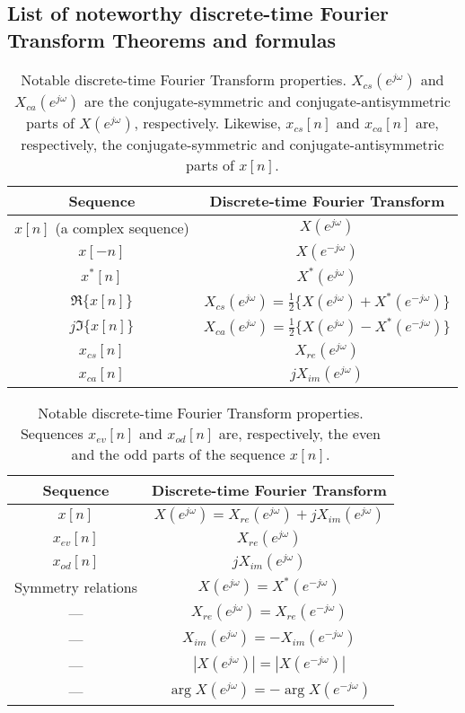 \documentclass[\documentfontsize, twocolumn]{\classname}
\begin{document}
\subsection{List of noteworthy discrete-time Fourier Transform Theorems and formulas}

\begin{table*}[ht]
\centering
\begin{tabular}{c c}
    \hline
    \textbf{Sequence} & \textbf{Discrete-time Fourier Transform} \\
    \hline
    $x[n]$ (a complex sequence) & $X(e^{j\omega})$ \\
    \hline
    $x[-n]$ & $X(e^{-j\omega})$ \\
    $x^*[n]$ & $X^*(e^{j\omega})$ \\
    $\Re{\{x[n]\}}$ & $X_{cs}(e^{j\omega}) = \frac 1 2 \{X(e^{j\omega}) + X^*(e^{-j\omega})\}$\\
    $j\Im{\{x[n]\}}$ & $X_{ca}(e^{j\omega}) = \frac 1 2 \{X(e^{j\omega}) - X^*(e^{-j\omega})\}$\\
    $x_{cs}[n]$ & $X_{re}(e^{j\omega})$ \\
    $x_{ca}[n]$ & $jX_{im}(e^{j\omega})$ \\
    \hline
\end{tabular}
\caption{Notable discrete-time Fourier Transform properties. $X_{cs}(e^{j\omega})$ and $X_{ca}(e^{j\omega})$ are the conjugate-symmetric and conjugate-antisymmetric parts of $X(e^{j\omega})$, respectively. Likewise, $x_{cs}[n]$ and $x_{ca}[n]$ are, respectively, the conjugate-symmetric and conjugate-antisymmetric parts of $x[n]$.}\label{tab:discreteTimeFourierTransformPropertiesAndTheorems}
\end{table*}

\begin{table*}[ht]
\centering
\begin{tabular}{c c}
    \hline
    \textbf{Sequence} & \textbf{Discrete-time Fourier Transform} \\
    \hline
    $x[n]$ & $X(e^{j\omega}) = X_{re}(e^{j\omega}) + jX_{im}(e^{j\omega})$ \\
    \hline
    $x_{ev}[n]$ & $X_{re}(e^{j\omega})$ \\
    $x_{od}[n]$ & $jX_{im}(e^{j\omega})$ \\
    \hline
    Symmetry relations & $X(e^{j\omega}) = X^*(e^{-j\omega})$ \\
    --- & $X_{re}(e^{j\omega}) = X_{re}(e^{-j\omega})$ \\
    --- & $X_{im}(e^{j\omega}) = -X_{im}(e^{-j\omega})$ \\
    --- & $|X(e^{j\omega})| = |X(e^{-j\omega})|$ \\
    --- & $\arg{X(e^{j\omega})} = -\arg{X(e^{-j\omega})}$ \\
    \hline
\end{tabular}
\caption{Notable discrete-time Fourier Transform properties. Sequences $x_{ev}[n]$ and $x_{od}[n]$ are, respectively, the even and the odd parts of the sequence $x[n]$.}\label{tab:discreteTimeFourierTransformPropertiesAndTheorems2}
\end{table*}
\end{document}
